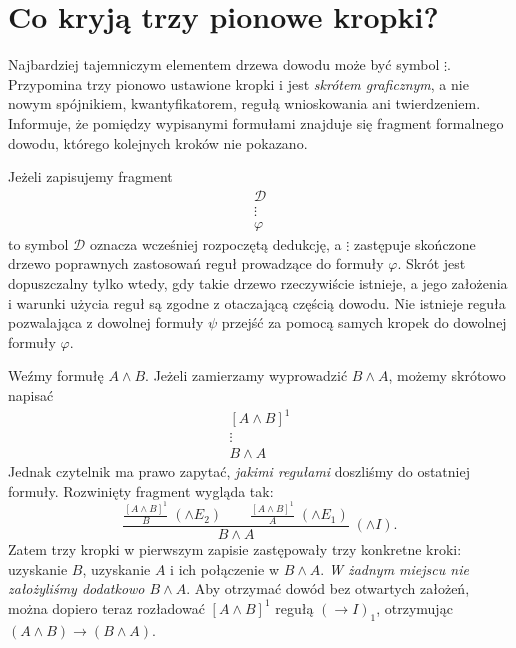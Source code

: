 \section{Co kryją trzy pionowe kropki?}\label{sec:nd-vertical-dots}
Najbardziej tajemniczym elementem drzewa dowodu może być symbol
$\vdots$. Przypomina trzy pionowo ustawione kropki i jest
\emph{skrótem graficznym}, a nie nowym spójnikiem, kwantyfikatorem,
regułą wnioskowania ani twierdzeniem. Informuje, że pomiędzy
wypisanymi formułami znajduje się fragment formalnego dowodu,
którego kolejnych kroków nie pokazano.

\begin{definicja}
Jeżeli zapisujemy fragment
\[
\begin{array}{c}
\mathcal D\\[-2pt]
\vdots\\[-2pt]
\varphi
\end{array}
\]
to symbol $\mathcal D$ oznacza wcześniej rozpoczętą dedukcję,
a $\vdots$ zastępuje skończone drzewo poprawnych zastosowań
reguł prowadzące do formuły $\varphi$.
Skrót jest dopuszczalny tylko wtedy, gdy takie drzewo
rzeczywiście istnieje, a jego założenia i warunki użycia
reguł są zgodne z otaczającą częścią dowodu.
Nie istnieje reguła pozwalająca z dowolnej formuły $\psi$
przejść za pomocą samych kropek do dowolnej formuły $\varphi$.
\end{definicja}

\begin{przyklad}
Weźmy formułę $A\land B$. Jeżeli zamierzamy wyprowadzić
$B\land A$, możemy skrótowo napisać
\[
\begin{array}{c}
[A\land B]^1\\
\vdots\\
B\land A
\end{array}
\]
Jednak czytelnik ma prawo zapytać, \emph{jakimi regułami}
doszliśmy do ostatniej formuły. Rozwinięty fragment wygląda tak:
\[
\frac{
  \displaystyle\frac{[A\land B]^1}{B}\;(\land E_2)
  \qquad
  \displaystyle\frac{[A\land B]^1}{A}\;(\land E_1)
}{B\land A}\;(\land I).
\]
Zatem trzy kropki w pierwszym zapisie zastępowały
trzy konkretne kroki: uzyskanie $B$, uzyskanie $A$
i ich połączenie w $B\land A$.
\emph{W żadnym miejscu nie założyliśmy dodatkowo $B\land A$}.
Aby otrzymać dowód bez otwartych założeń,
można dopiero teraz rozładować $[A\land B]^1$
regułą $(\to I)_1$, otrzymując $(A\land B)\to(B\land A)$.
\end{przyklad}


